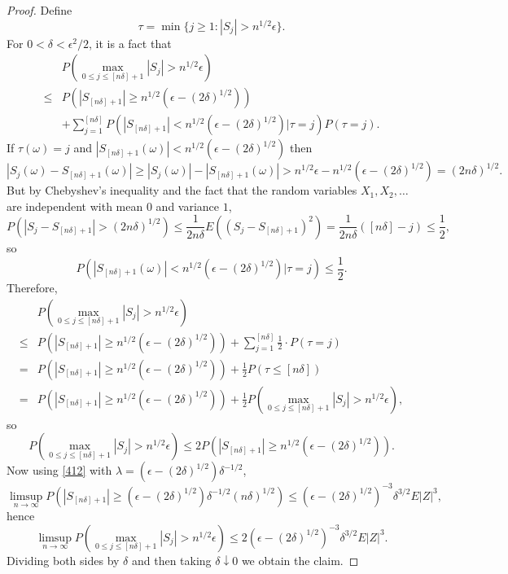 \documentclass{article}
\theoremstyle{definition}
\begin{document}
\begin{proof}
Define
\[
\tau = \min\{j \geq 1: |S_j| > n^{1/2} \epsilon\}.
\]
For $0<\delta<\epsilon^2/2$, it is a fact that
\[
\begin{split}
&P\left( \max_{0 \leq j \leq [n\delta]+1} |S_j| > n^{1/2}\epsilon \right)\\
\leq & P(|S_{[n\delta]+1}| \geq n^{1/2}  (\epsilon - (2\delta)^{1/2}))\\
&+\sum_{j=1}^{[n\delta]} P(|S_{[n\delta]+1}| < n^{1/2}(\epsilon - (2\delta)^{1/2}) | \tau = j) P(\tau = j).
\end{split}
\]
If $\tau(\omega) = j$ and $|S_{[n\delta]+1}(\omega)| < n^{1/2}(\epsilon-(2\delta)^{1/2})$ then
\[
|S_j(\omega) - S_{[n\delta]+1}(\omega)| \geq |S_j(\omega)| - |S_{[n\delta]+1}(\omega)|
>n^{1/2} \epsilon  - n^{1/2}(\epsilon-(2\delta)^{1/2})
=(2n\delta)^{1/2}.
\]
But by Chebyshev's inequality  and the fact that the random variables $X_1,X_2,\ldots$ are independent with mean $0$ and variance $1$,
\[
P( |S_j  -  S_{[n\delta]+1}| > (2n\delta)^{1/2}) \leq \frac{1}{2n\delta} E( (S_j  -  S_{[n\delta]+1})^2)
= \frac{1}{2n\delta} ([n\delta]-j) \leq \frac{1}{2},
\]
so
\[
P(|S_{[n\delta]+1}(\omega)| < n^{1/2}(\epsilon-(2\delta)^{1/2}) | \tau = j) \leq \frac{1}{2}.
\]
Therefore,
\[
\begin{split}
&P\left( \max_{0 \leq j \leq [n\delta]+1} |S_j| > n^{1/2}\epsilon \right)\\
\leq & P(|S_{[n\delta]+1}| \geq n^{1/2}  (\epsilon - (2\delta)^{1/2})) + \sum_{j=1}^{[n\delta]} \frac{1}{2} \cdot P(\tau = j)\\
=&P(|S_{[n\delta]+1}| \geq n^{1/2}  (\epsilon - (2\delta)^{1/2}))  + \frac{1}{2} P(\tau \leq [n\delta])\\
=&P(|S_{[n\delta]+1}| \geq n^{1/2}  (\epsilon - (2\delta)^{1/2}))  + \frac{1}{2} P\left(\max_{0 \leq j \leq [n\delta]+1} |S_j| > n^{1/2} \epsilon \right),
\end{split}
\]
so
\[
P\left( \max_{0 \leq j \leq [n\delta]+1} |S_j| > n^{1/2}\epsilon \right) \leq 2 P(|S_{[n\delta]+1}| \geq n^{1/2}  (\epsilon - (2\delta)^{1/2})).
\]
Now using \eqref{412} with $\lambda =  (\epsilon - (2\delta)^{1/2}) \delta^{-1/2}$, 
\[
\limsup_{n \to \infty} P(|S_{[n\delta]+1}| \geq  (\epsilon - (2\delta)^{1/2}) \delta^{-1/2} (n\delta)^{1/2}) \leq   (\epsilon - (2\delta)^{1/2})^{-3} \delta^{3/2} E|Z|^3,
\]
hence
\[
\limsup_{n \to \infty} P\left( \max_{0 \leq j \leq [n\delta]+1} |S_j| > n^{1/2}\epsilon \right)
\leq 2 (\epsilon - (2\delta)^{1/2})^{-3} \delta^{3/2} E|Z|^3.
\]
Dividing both sides by $\delta$ and then taking $\delta \downarrow 0$ we obtain the claim.
\end{proof}
\end{document}
